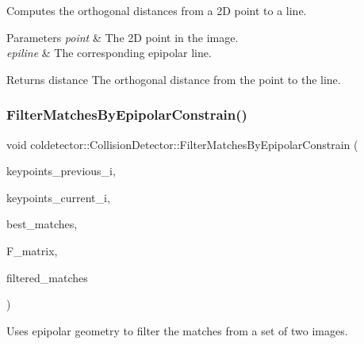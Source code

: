 Computes the orthogonal distances from a 2D point to a line. 


\begin{DoxyParams}{Parameters}
{\em point} & The 2D point in the image. \\
\hline
{\em epiline} & The corresponding epipolar line. \\
\hline
\end{DoxyParams}
\begin{DoxyReturn}{Returns}
distance The orthogonal distance from the point to the line. 
\end{DoxyReturn}
\mbox{\label{classcoldetector_1_1CollisionDetector_a3464d9594b80dcda080bff19f7f9f9e3}} 
\subsubsection{\texorpdfstring{Filter\+Matches\+By\+Epipolar\+Constrain()}{FilterMatchesByEpipolarConstrain()}}
{\footnotesize\ttfamily void coldetector\+::\+Collision\+Detector\+::\+Filter\+Matches\+By\+Epipolar\+Constrain (\begin{DoxyParamCaption}\item[{const std\+::vector$<$ cv\+::\+Key\+Point $>$ \&}]{keypoints\+\_\+previous\+\_\+i,  }\item[{const std\+::vector$<$ cv\+::\+Key\+Point $>$ \&}]{keypoints\+\_\+current\+\_\+i,  }\item[{const std\+::vector$<$ cv\+::\+D\+Match $>$ \&}]{best\+\_\+matches,  }\item[{const cv\+::\+Mat \&}]{F\+\_\+matrix,  }\item[{std\+::vector$<$ cv\+::\+D\+Match $>$ \&}]{filtered\+\_\+matches }\end{DoxyParamCaption})}



Uses epipolar geometry to filter the matches from a set of two images. 


